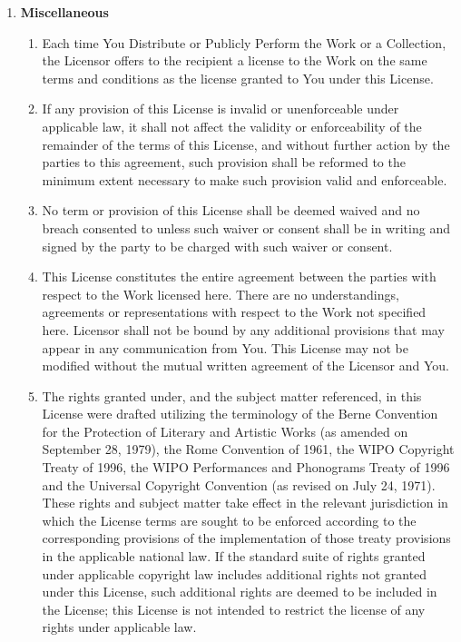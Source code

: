 \begin{enumerate}
  \item {\textbf{Miscellaneous}} 
  \begin{enumerate} 
    \item {Each time You Distribute or Publicly Perform the Work or a
    Collection, the Licensor offers to the recipient a license to the Work on
    the same terms and conditions as the license granted to You under this
    License.}
    \item {If any provision of this License is invalid or unenforceable under
    applicable law, it shall not affect the validity or enforceability of the
    remainder of the terms of this License, and without further action by the
    parties to this agreement, such provision shall be reformed to the minimum
    extent necessary to make such provision valid and enforceable.}
    \item {No term or provision of this License shall be deemed waived and no
    breach consented to unless such waiver or consent shall be in writing and
    signed by the party to be charged with such waiver or consent.}
    \item {This License constitutes the entire agreement between the parties
    with respect to the Work licensed here. There are no understandings,
    agreements or representations with respect to the Work not specified here.
    Licensor shall not be bound by any additional provisions that may appear in
    any communication from You. This License may not be modified without the
    mutual written agreement of the Licensor and You.}
    \item {The rights granted under, and the subject matter referenced, in this
    License were drafted utilizing the terminology of the Berne Convention for
    the Protection of Literary and Artistic Works (as amended on September 28,
    1979), the Rome Convention of 1961, the WIPO Copyright Treaty of 1996, the
    WIPO Performances and Phonograms Treaty of 1996 and the Universal Copyright
    Convention (as revised on July 24, 1971). These rights and subject matter
    take effect in the relevant jurisdiction in which the License terms are
    sought to be enforced according to the corresponding provisions of the
    implementation of those treaty provisions in the applicable national law. If
    the standard suite of rights granted under applicable copyright law includes
    additional rights not granted under this License, such additional rights are
    deemed to be included in the License; this License is not intended to
    restrict the license of any rights under applicable law.}
  \end{enumerate}

\end{enumerate}
